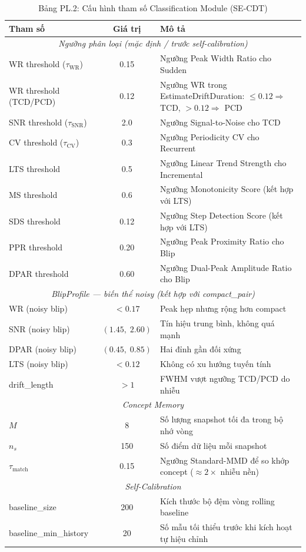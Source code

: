 \begin{table}[H]
	\centering
	\caption*{Bảng PL.2: Cấu hình tham số Classification Module (SE-CDT)}
	\begin{tabular}{|l|c|p{7cm}|}
		\hline
		\textbf{Tham số} & \textbf{Giá trị} & \textbf{Mô tả} \\
		\hline
		\multicolumn{3}{|c|}{\textit{Ngưỡng phân loại (mặc định / trước self-calibration)}} \\
		\hline
		WR threshold ($\tau_{\text{WR}}$) & 0.15 & Ngưỡng Peak Width Ratio cho Sudden \\
		WR threshold (TCD/PCD) & 0.12 & Ngưỡng WR trong EstimateDriftDuration: $\leq 0.12 \Rightarrow$ TCD, $> 0.12 \Rightarrow$ PCD \\
		SNR threshold ($\tau_{\text{SNR}}$) & 2.0 & Ngưỡng Signal-to-Noise cho TCD \\
		CV threshold ($\tau_{\text{CV}}$) & 0.3 & Ngưỡng Periodicity CV cho Recurrent \\
		LTS threshold & 0.5 & Ngưỡng Linear Trend Strength cho Incremental \\
		MS threshold & 0.6 & Ngưỡng Monotonicity Score (kết hợp với LTS) \\
		SDS threshold & 0.12 & Ngưỡng Step Detection Score (kết hợp với LTS) \\
		PPR threshold & 0.20 & Ngưỡng Peak Proximity Ratio cho Blip \\
		DPAR threshold & 0.60 & Ngưỡng Dual-Peak Amplitude Ratio cho Blip \\
		\hline
		\multicolumn{3}{|c|}{\textit{BlipProfile --- biến thể noisy (kết hợp với compact\_pair)}} \\
		\hline
		WR (noisy blip) & $< 0.17$ & Peak hẹp nhưng rộng hơn compact \\
		SNR (noisy blip) & $(1.45,\; 2.60)$ & Tín hiệu trung bình, không quá mạnh \\
		DPAR (noisy blip) & $(0.45,\; 0.85)$ & Hai đỉnh gần đối xứng \\
		LTS (noisy blip) & $< 0.12$ & Không có xu hướng tuyến tính \\
		drift\_length & $> 1$ & FWHM vượt ngưỡng TCD/PCD do nhiễu \\
		\hline
		\multicolumn{3}{|c|}{\textit{Concept Memory}} \\
		\hline
		$M$ & 8 & Số lượng snapshot tối đa trong bộ nhớ vòng \\
		$n_s$ & 150 & Số điểm dữ liệu mỗi snapshot \\
		$\tau_{\text{match}}$ & 0.15 & Ngưỡng Standard-MMD để so khớp concept ($\approx 2\times$ nhiễu nền) \\
		\hline
		\multicolumn{3}{|c|}{\textit{Self-Calibration}} \\
		\hline
		baseline\_size & 200 & Kích thước bộ đệm vòng rolling baseline \\
		baseline\_min\_history & 20 & Số mẫu tối thiểu trước khi kích hoạt tự hiệu chỉnh \\
		\hline
	\end{tabular}
\end{table}

